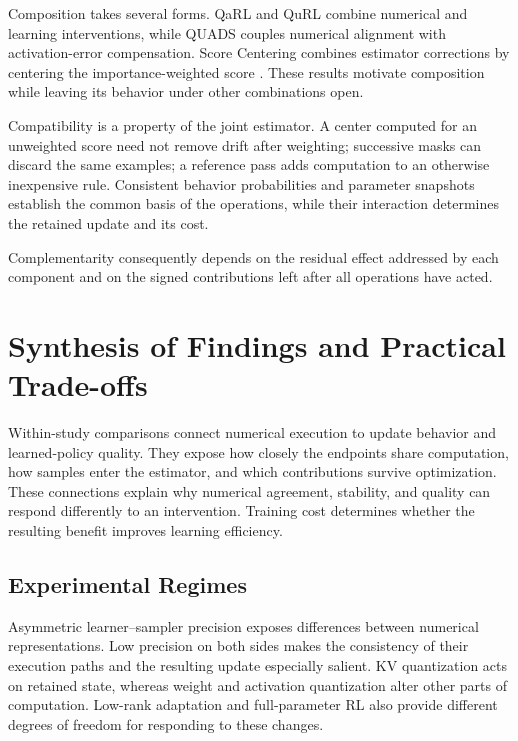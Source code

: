 Composition takes several forms. QaRL and QuRL combine numerical and learning interventions, while QUADS couples numerical alignment with activation-error compensation. Score Centering combines estimator corrections by centering the importance-weighted score \citep{qarl,qurl,quads,score}. These results motivate composition while leaving its behavior under other combinations open.

Compatibility is a property of the joint estimator. A center computed for an unweighted score need not remove drift after weighting; successive masks can discard the same examples; a reference pass adds computation to an otherwise inexpensive rule. Consistent behavior probabilities and parameter snapshots establish the common basis of the operations, while their interaction determines the retained update and its cost.

Complementarity consequently depends on the residual effect addressed by each component and on the signed contributions left after all operations have acted.


\section{Synthesis of Findings and Practical Trade-offs}\label{sec:synthesis}
Within-study comparisons connect numerical execution to update behavior and learned-policy quality. They expose how closely the endpoints share computation, how samples enter the estimator, and which contributions survive optimization. These connections explain why numerical agreement, stability, and quality can respond differently to an intervention. Training cost determines whether the resulting benefit improves learning efficiency.

\subsection{Experimental Regimes}
Asymmetric learner--sampler precision exposes differences between numerical representations. Low precision on both sides makes the consistency of their execution paths and the resulting update especially salient. KV quantization acts on retained state, whereas weight and activation quantization alter other parts of computation. Low-rank adaptation and full-parameter RL also provide different degrees of freedom for responding to these changes.

